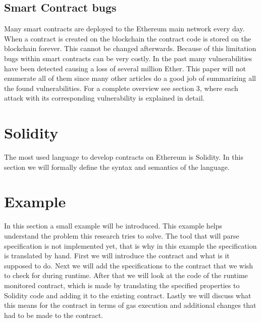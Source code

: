 \documentclass[a4paper]{article}
\begin{document}
\subsection{Smart Contract bugs}
Many smart contracts are deployed to the Ethereum main network every day. When a contract is created on the blockchain the contract code is stored on the blockchain forever. This cannot be changed afterwards. Because of this limitation bugs within smart contracts can be very costly. In the past many vulnerabilities have been detected causing a loss of several million Ether. This paper will not enumerate all of them since many other articles do a good job of summarizing all the found vulnerabilities. For a complete overview see \cite{dika2017ethereum} section 3, where each attack with its corresponding vulnerability is explained in detail.

\section{Solidity}
\label{sec:solidity}
The most used language to develop contracts on Ethereum is Solidity. In this section we will formally define the syntax and semantics of the language.




\section{Example}
In this section a small example will be introduced. This example helps understand the problem this research tries to solve. The tool that will parse specification is not implemented yet, that is why in this example the specification is translated by hand. First we will introduce the contract and what is it supposed to do. Next we will add the specifications to the contract that we wish to check for during runtime. After that we will look at the code of the runtime monitored contract, which is made by translating the specified properties to Solidity code and adding it to the existing contract. Lastly we will discuss what this means for the contract in terms of gas execution and additional changes that had to be made to the contract.
\end{document}
